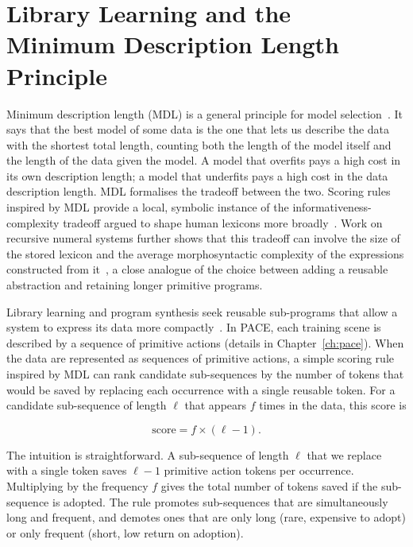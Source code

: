 \section{Library Learning and the Minimum Description Length Principle}
\label{sec:bg-mdl}

Minimum description length (MDL) is a general principle for model selection~\cite{rissanen_modeling_1978,li_introduction_2008}. It says that the best model of some data is the one that lets us describe the data with the shortest total length, counting both the length of the model itself and the length of the data given the model. A model that overfits pays a high cost in its own description length; a model that underfits pays a high cost in the data description length. MDL formalises the tradeoff between the two.
Scoring rules inspired by MDL provide a local, symbolic instance of the informativeness-complexity tradeoff argued to shape human lexicons more broadly~\cite{gibson_how_2019,kemp_kinship_2012,zaslavsky_efficient_2018,macwhinney_word_2015}. Work on recursive numeral systems further shows that this tradeoff can involve the size of the stored lexicon and the average morphosyntactic complexity of the expressions constructed from it~\cite{denic_recursive_2024}, a close analogue of the choice between adding a reusable abstraction and retaining longer primitive programs.

Library learning and program synthesis seek reusable sub-programs that allow a system to express its data more compactly~\cite{gulwani_program_2017,tian_learning_2020,ellis_dreamcoder_2021,bowers_top-down_2023}. In PACE, each training scene is described by a sequence of primitive actions (details in Chapter~\ref{ch:pace}). When the data are represented as sequences of primitive actions, a simple scoring rule inspired by MDL can rank candidate sub-sequences by the number of tokens that would be saved by replacing each occurrence with a single reusable token. For a candidate sub-sequence of length $\ell$ that appears $f$ times in the data, this score is

\begin{equation}
\text{score} = f \times (\ell - 1).
\end{equation}

The intuition is straightforward. A sub-sequence of length $\ell$ that we replace with a single token saves $\ell - 1$ primitive action tokens per occurrence. Multiplying by the frequency $f$ gives the total number of tokens saved if the sub-sequence is adopted. The rule promotes sub-sequences that are simultaneously long and frequent, and demotes ones that are only long (rare, expensive to adopt) or only frequent (short, low return on adoption).

